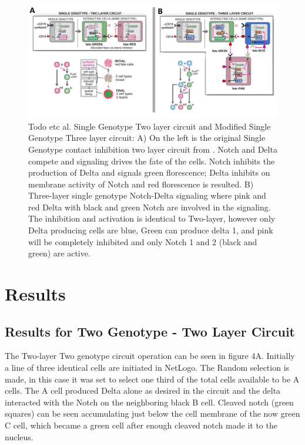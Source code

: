 \documentclass[12pt]{ifacconf}
\begin{document}
\begin{figure}
\begin{center}
\includegraphics[width=\textwidth]{Modification} %
\caption{Todo etc al. Single Genotype Two layer circuit and Modified Single Genotype Three layer circuit: A) On the left is the original Single Genotype contact inhibition two layer circuit from \cite{TP:18}. Notch and Delta compete and signaling drives the fate of the cells. Notch inhibits the production of Delta and signals green florescence; Delta inhibits on membrane activity of Notch and red florescence is resulted. B) Three-layer single genotype Notch-Delta signaling where pink and red Delta with black and green Notch are involved in the signaling. The inhibition and activation is identical to Two-layer, however only Delta producing cells are blue, Green can produce delta 1, and pink will be completely inhibited and only Notch 1 and 2 (black and green) are active. } 
\label{fig:bifurcation}
\end{center}
\end{figure}

\section{Results}

\subsection{Results for Two Genotype - Two Layer Circuit} 

The Two-layer Two genotype circuit operation can be seen in figure 4A. Initially a line of three identical cells are initiated in NetLogo. The Random selection is made, in this case it was set to select one third of the total cells available to be A cells. The A cell produced Delta alone as desired in the circuit and the delta interacted with the Notch on the neighboring black B cell. Cleaved notch (green squares) can be seen accumulating just below the cell membrane of the now green C cell, which became a green cell after enough cleaved notch made it to the nucleus.
\end{document}
